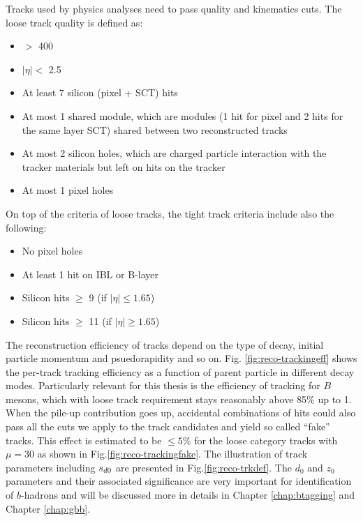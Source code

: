 Tracks used by physics analyses need to pass quality and kinematics cuts. The loose track quality\cite{ATL-PHYS-PUB-2015-018} is defined as:

\begin{itemize}
\item \pT $>$ 400 \mev
\item $|\eta| < $ 2.5
\item At least 7 silicon (pixel + SCT) hits
\item At most 1 shared module, which are modules (1 hit for pixel and 2 hits for the same layer SCT) shared between two reconstructed tracks
\item At most 2 silicon holes, which are charged particle interaction with the tracker materials but left on hits on the tracker 
\item At most 1 pixel holes
\end{itemize}

On top of the criteria of loose tracks, the tight track criteria\cite{ATL-PHYS-PUB-2015-018} include also the following:

\begin{itemize}
\item No pixel holes
\item At least 1 hit on IBL or B-layer
\item Silicon hits $\geq$ 9 (if $|\eta|\leq 1.65$)
\item Silicon hits $\geq$ 11 (if $|\eta|\geq 1.65$)
\end{itemize}

The reconstruction efficiency of tracks depend on the type of decay, initial particle momentum and psuedorapidity and so on. Fig. \ref{fig:reco-trackingeff} shows the per-track tracking efficiency as a function of parent particle \pt in different decay modes. Particularly relevant for this thesis is the efficiency of tracking for $B$ mesons, which with loose track requirement stays reasonably above 85\% up to 1\TeV. When the pile-up contribution goes up, accidental combinations of hits could also pass all the cuts we apply to the track candidates and yield so called ``fake'' tracks. This effect is estimated to be $\leq 5\%$ for the loose category tracks with $\mu = 30$ as shown in Fig.\ref{fig:reco-trackingfake}.  The illustration of track parameters including $s_{d0}$ are presented in Fig.\ref{fig:reco-trkdef}. The $d_0$ and $z_0$ parameters and their associated significance are very important for identification of $b$-hadrons and will be discussed more in details in Chapter \ref{chap:btagging} and Chapter \ref{chap:gbb}.


